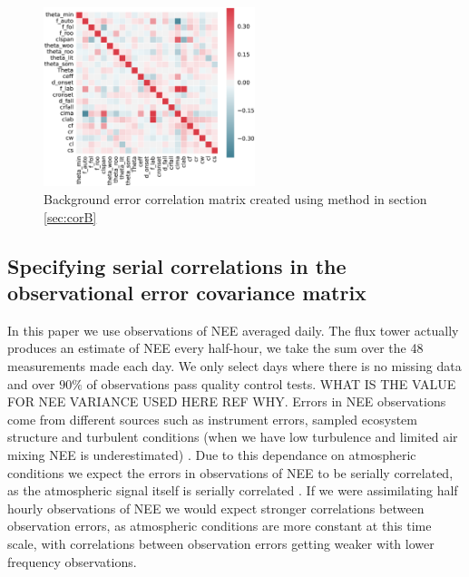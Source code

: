 \documentclass[11pt]{article}
\begin{document}
\begin{figure}[ht]
    \centering
    \includegraphics[width=0.55\textwidth]{edccorb.eps}
    \caption{Background error correlation matrix created using method in section \ref{sec:corB}}
    \label{fig:Bcorr}
\end{figure}

\subsection{Specifying serial correlations in the observational error covariance matrix} \label{sec:corR}

In this paper we use observations of NEE averaged daily. The flux tower actually produces an estimate of NEE every half-hour, we take the sum over the 48 measurements made each day. We only select days where there is no missing data and over $90\% $ of observations pass quality control tests. WHAT IS THE VALUE FOR NEE VARIANCE USED HERE REF WHY. Errors in NEE observations come from different sources such as instrument errors, sampled ecosystem structure and turbulent conditions (when we have low turbulence and limited air mixing NEE is underestimated) \citep{Papale2006}. Due to this dependance on atmospheric conditions we expect the errors in observations of NEE to be serially correlated, as the atmospheric signal itself is serially correlated \citep{Daley1992}. If we were assimilating half hourly observations of NEE we would expect stronger correlations between observation errors, as atmospheric conditions are more constant at this time scale, with correlations between observation errors getting weaker with lower frequency observations. 
\end{document}
